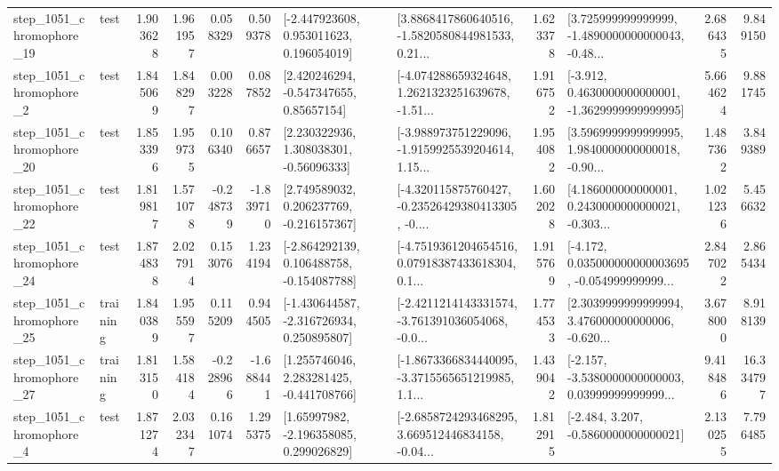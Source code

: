 \begin{tabular}{llrrrrllrlrr}
 step\_1051\_chromophore\_19 &      test &      1.903628 &    1.961957 &      0.058329 &  0.509378 &    [-2.447923608, 0.953011623, 0.196054019] &  [3.8868417860640516, -1.5820580844981533, 0.21... &       1.623378 &  [3.725999999999999, -1.4890000000000043, -0.48... &            2.686435 &          9.849150 \\
  step\_1051\_chromophore\_2 &      test &      1.845069 &    1.848297 &      0.003228 &  0.087852 &     [2.420246294, -0.547347655, 0.85657154] &  [-4.074288659324648, 1.2621323251639678, -1.51... &       1.916752 &  [-3.912, 0.4630000000000001, -1.3629999999999995] &            5.664624 &          9.881745 \\
 step\_1051\_chromophore\_20 &      test &      1.853396 &    1.959735 &      0.106340 &  0.876657 &     [2.230322936, 1.308038301, -0.56096333] &  [-3.988973751229096, -1.9159925539204614, 1.15... &       1.954082 &  [3.5969999999999995, 1.9840000000000018, -0.90... &            1.487362 &          3.849389 \\
 step\_1051\_chromophore\_22 &      test &      1.819817 &    1.571078 &     -0.248739 & -1.839710 &    [2.749589032, 0.206237769, -0.216157367] &  [-4.320115875760427, -0.23526429380413305, -0.... &       1.602028 &  [4.186000000000001, 0.2430000000000021, -0.303... &            1.021236 &          5.456632 \\
 step\_1051\_chromophore\_24 &      test &      1.874838 &    2.027914 &      0.153076 &  1.234194 &   [-2.864292139, 0.106488758, -0.154087788] &  [-4.7519361204654516, 0.07918387433618304, 0.1... &       1.915769 &  [-4.172, 0.035000000000003695, -0.054999999999... &            2.847022 &          2.865434 \\
 step\_1051\_chromophore\_25 &  training &      1.840389 &    1.955597 &      0.115209 &  0.944505 &   [-1.430644587, -2.316726934, 0.250895807] &  [-2.4211214143331574, -3.761391036054068, -0.0... &       1.774533 &  [2.3039999999999994, 3.476000000000006, -0.620... &            3.678000 &          8.918139 \\
 step\_1051\_chromophore\_27 &  training &      1.813150 &    1.584184 &     -0.228966 & -1.688441 &    [1.255746046, 2.283281425, -0.441708766] &  [-1.8673366834440095, -3.3715565651219985, 1.1... &       1.439042 &  [-2.157, -3.5380000000000003, 0.03999999999999... &            9.418486 &         16.334797 \\
  step\_1051\_chromophore\_4 &      test &      1.871274 &    2.032347 &      0.161074 &  1.295375 &     [1.65997982, -2.196358085, 0.299026829] &  [-2.6858724293468295, 3.669512446834158, -0.04... &       1.812915 &               [-2.484, 3.207, -0.5860000000000021] &            2.130255 &          7.796485 \\

\end{tabular}
